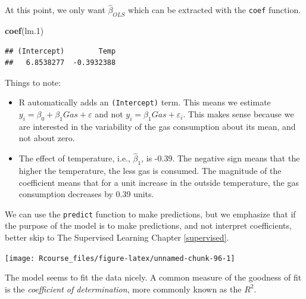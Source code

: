 \documentclass[]{book}
\newenvironment{Shaded}{\begin{snugshade}}{\end{snugshade}}
\newcommand{\KeywordTok}[1]{\textcolor[rgb]{0.13,0.29,0.53}{\textbf{{#1}}}}
\newcommand{\DataTypeTok}[1]{\textcolor[rgb]{0.13,0.29,0.53}{{#1}}}
\newcommand{\DecValTok}[1]{\textcolor[rgb]{0.00,0.00,0.81}{{#1}}}
\newcommand{\FloatTok}[1]{\textcolor[rgb]{0.00,0.00,0.81}{{#1}}}
\newcommand{\StringTok}[1]{\textcolor[rgb]{0.31,0.60,0.02}{{#1}}}
\newcommand{\NormalTok}[1]{{#1}}
\theoremstyle{definition}
\theoremstyle{definition}
\theoremstyle{remark}
\begin{document}
At this point, we only want \(\hat \beta_{OLS}\) which can be extracted
with the \texttt{coef} function.

\begin{Shaded}
\begin{Highlighting}[]
\KeywordTok{coef}\NormalTok{(lm}\FloatTok{.1}\NormalTok{)}
\end{Highlighting}
\end{Shaded}

\begin{verbatim}
## (Intercept)        Temp 
##   6.8538277  -0.3932388
\end{verbatim}

Things to note:

\begin{itemize}
\item
  R automatically adds an \texttt{(Intercept)} term. This means we
  estimate \(y_i=\beta_0 + \beta_1 Gas + \varepsilon\) and not
  \(y_i=\beta_1 Gas + \varepsilon_i\). This makes sense because we are
  interested in the variability of the gas consumption about its mean,
  and not about zero.
\item
  The effect of temperature, i.e., \(\hat \beta_1\), is -0.39. The
  negative sign means that the higher the temperature, the less gas is
  consumed. The magnitude of the coefficient means that for a unit
  increase in the outside temperature, the gas consumption decreases by
  0.39 units.
\end{itemize}

We can use the \texttt{predict} function to make predictions, but we
emphasize that if the purpose of the model is to make predictions, and
not interpret coefficients, better skip to The Supervised Learning
Chapter \ref{supervised}.

\begin{Shaded}
\end{Shaded}

\texttt{[image: Rcourse\_files/figure-latex/unnamed-chunk-96-1]}

The model seems to fit the data nicely. A common measure of the goodness
of fit is the \emph{coefficient of determination}, more commonly known
as the \(R^2\).
\end{document}
